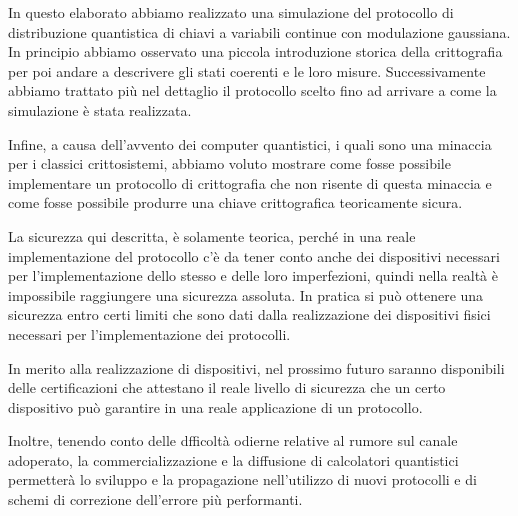 In questo elaborato abbiamo realizzato una simulazione del protocollo di distribuzione quantistica di chiavi a variabili continue con modulazione gaussiana. In principio abbiamo osservato una piccola introduzione storica della crittografia per poi andare a descrivere gli stati coerenti e le loro misure. Successivamente abbiamo trattato pi\`u nel dettaglio il protocollo scelto fino ad arrivare a come la simulazione \`e stata realizzata.

Infine, a causa dell'avvento dei computer quantistici, i quali sono una minaccia per i classici crittosistemi, abbiamo voluto mostrare come fosse possibile implementare un protocollo di crittografia che non risente di questa minaccia e come fosse possibile produrre una chiave crittografica teoricamente sicura.

La sicurezza qui descritta, \`e solamente teorica, perch\'e in una reale implementazione del protocollo c'\`e da tener conto anche dei dispositivi necessari per l'implementazione dello stesso e delle loro imperfezioni, quindi nella realt\`a \`e impossibile raggiungere una sicurezza assoluta. In pratica si pu\`o ottenere una sicurezza entro certi limiti che sono dati dalla realizzazione dei dispositivi fisici necessari per l'implementazione dei protocolli.

In merito alla realizzazione di dispositivi, nel prossimo futuro saranno disponibili delle certificazioni che attestano il reale livello di sicurezza che un certo dispositivo pu\`o garantire in una reale applicazione di un protocollo.

\break
Inoltre, tenendo conto delle dfficolt\`a odierne relative al rumore sul canale adoperato, la commercializzazione e la diffusione di calcolatori quantistici permetter\`a lo sviluppo e la propagazione nell'utilizzo di nuovi protocolli e di schemi di correzione dell'errore pi\`u performanti.




